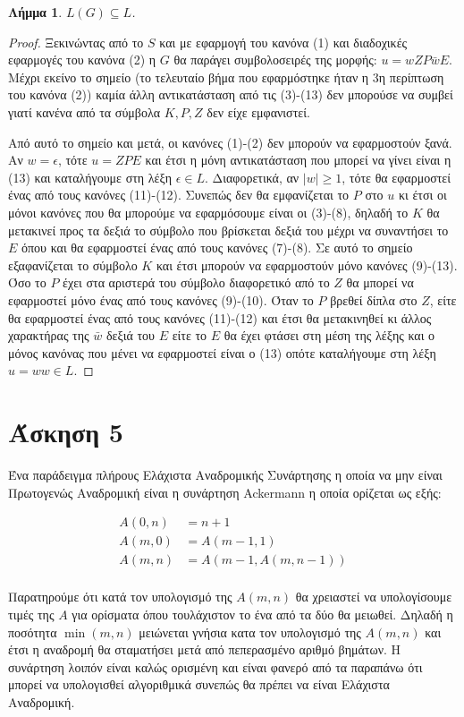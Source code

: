 \documentclass[a4paper, oneside, 11pt]{article}
\newtheorem{lm}[thm]{Λήμμα}
\theoremstyle{definition}
\begin{document}
\begin{lm}
$L(G) \subseteq L$.
\end{lm}
\begin{proof}
Ξεκινώντας από το $S$ και με εφαρμογή του κανόνα (1) και διαδοχικές εφαρμογές
του κανόνα (2) η $G$ θα παράγει συμβολοσειρές της μορφής: $u = wZP\bar{w}E$. Μέχρι
εκείνο το σημείο (το τελευταίο βήμα που εφαρμόστηκε ήταν η 3η περίπτωση του
κανόνα (2)) καμία άλλη αντικατάσταση από τις (3)-(13) δεν μπορούσε να συμβεί
γιατί κανένα από τα σύμβολα $K, P, Z$ δεν είχε εμφανιστεί.

Από αυτό το σημείο και μετά, οι κανόνες (1)-(2) δεν μπορούν να εφαρμοστούν ξανά.
Αν $w = \epsilon$, τότε $u = ZPE$ και έτσι η μόνη αντικατάσταση που μπορεί να
γίνει είναι η (13) και καταλήγουμε στη λέξη $\epsilon \in L$.  Διαφορετικά, αν
$|w| \geq 1$, τότε θα εφαρμοστεί ένας από τους κανόνες (11)-(12). Συνεπώς δεν θα
εμφανίζεται το $P$ στο $u$ κι έτσι οι μόνοι κανόνες που θα μπορούμε να
εφαρμόσουμε είναι οι (3)-(8), δηλαδή το $K$ θα μετακινεί προς τα δεξιά το
σύμβολο που βρίσκεται δεξιά του μέχρι να συναντήσει το $E$ όπου και θα
εφαρμοστεί ένας από τους κανόνες (7)-(8). Σε αυτό το σημείο εξαφανίζεται το
σύμβολο $K$ και έτσι μπορούν να εφαρμοστούν μόνο κανόνες (9)-(13). Όσο το $P$
έχει στα αριστερά του σύμβολο διαφορετικό από το $Z$ θα μπορεί να εφαρμοστεί
μόνο ένας από τους κανόνες (9)-(10). Όταν το $P$ βρεθεί δίπλα στο $Z$, είτε θα
εφαρμοστεί ένας από τους κανόνες (11)-(12) και έτσι θα μετακινηθεί κι άλλος
χαρακτήρας της $\bar{w}$ δεξιά του $E$ είτε το $E$ θα έχει φτάσει στη μέση της
λέξης και ο μόνος κανόνας που μένει να εφαρμοστεί είναι ο (13) οπότε καταλήγουμε
στη λέξη $u = ww \in L$.

\end{proof}

\section*{Άσκηση 5}

Ένα παράδειγμα πλήρους Ελάχιστα Αναδρομικής Συνάρτησης η οποία να μην είναι
Πρωτογενώς Αναδρομική είναι η συνάρτηση Ackermann η οποία ορίζεται ως εξής:

\begin{align*}
   A(0, n) &= n + 1\\
   A(m, 0) &= A(m-1, 1)\\
   A(m, n) &= A(m-1, A(m, n-1))\\
\end{align*}

Παρατηρούμε ότι κατά τον υπολογισμό της $A(m, n)$ θα χρειαστεί να υπολογίσουμε
τιμές της $A$ για ορίσματα όπου τουλάχιστον το ένα από τα δύο θα μειωθεί. Δηλαδή
η ποσότητα $\min(m, n)$ μειώνεται γνήσια κατα τον υπολογισμό της $A(m, n)$ και
έτσι η αναδρομή θα σταματήσει μετά από πεπερασμένο αριθμό βημάτων. Η συνάρτηση
λοιπόν είναι καλώς ορισμένη και είναι φανερό από τα παραπάνω ότι μπορεί να
υπολογισθεί αλγοριθμικά συνεπώς θα πρέπει να είναι Ελάχιστα Αναδρομική.
\end{document}
